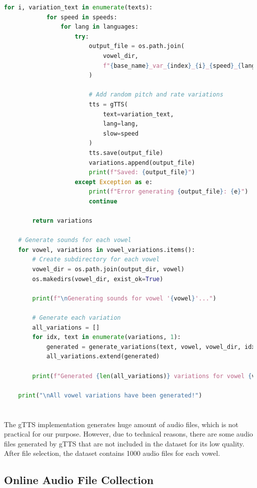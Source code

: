 \begin{lstlisting}[language=Python, caption={Audio Generation with gTTS}]
        for i, variation_text in enumerate(texts):
            for speed in speeds:
                for lang in languages:
                    try:
                        output_file = os.path.join(
                            vowel_dir, 
                            f"{base_name}_var_{index}_{i}_{speed}_{lang}.wav"
                        )
                        
                        # Add random pitch and rate variations
                        tts = gTTS(
                            text=variation_text,
                            lang=lang,
                            slow=speed
                        )
                        tts.save(output_file)
                        variations.append(output_file)
                        print(f"Saved: {output_file}")
                    except Exception as e:
                        print(f"Error generating {output_file}: {e}")
                        continue
        
        return variations
    
    # Generate sounds for each vowel
    for vowel, variations in vowel_variations.items():
        # Create subdirectory for each vowel
        vowel_dir = os.path.join(output_dir, vowel)
        os.makedirs(vowel_dir, exist_ok=True)
        
        print(f"\nGenerating sounds for vowel '{vowel}'...")
        
        # Generate each variation
        all_variations = []
        for idx, text in enumerate(variations, 1):
            generated = generate_variations(text, vowel, vowel_dir, idx)
            all_variations.extend(generated)
        
        print(f"Generated {len(all_variations)} variations for vowel {vowel}")
    
    print("\nAll vowel variations have been generated!")
    

\end{lstlisting}

\paragraph{}
The gTTS implementation generates huge amount of audio files, which is not practical for our purpose. However, due to technical reasons, there are some audio files generated by gTTS that are not included in the dataset for its low quality. After file selection, the dataset contains 1000 audio files for each vowel.
\subsection{Online Audio File Collection}

